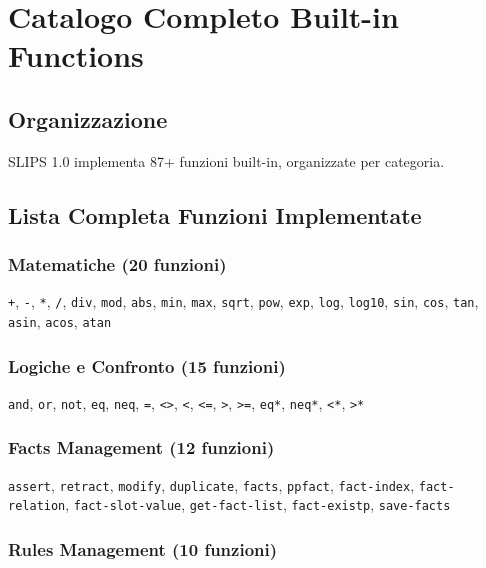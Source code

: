 
\chapter{Catalogo Completo Built-in Functions}
\label{app:builtin}

\section{Organizzazione}

SLIPS 1.0 implementa 87+ funzioni built-in, organizzate per categoria.

\section{Lista Completa Funzioni Implementate}

\subsection{Matematiche (20 funzioni)}

\texttt{+}, \texttt{-}, \texttt{*}, \texttt{/}, \texttt{div}, \texttt{mod}, \texttt{abs}, \texttt{min}, \texttt{max}, \texttt{sqrt}, \texttt{pow}, \texttt{exp}, \texttt{log}, \texttt{log10}, \texttt{sin}, \texttt{cos}, \texttt{tan}, \texttt{asin}, \texttt{acos}, \texttt{atan}

\subsection{Logiche e Confronto (15 funzioni)}

\texttt{and}, \texttt{or}, \texttt{not}, \texttt{eq}, \texttt{neq}, \texttt{=}, \texttt{<>}, \texttt{<}, \texttt{<=}, \texttt{>}, \texttt{>=}, \texttt{eq*}, \texttt{neq*}, \texttt{<*}, \texttt{>*}

\subsection{Facts Management (12 funzioni)}

\texttt{assert}, \texttt{retract}, \texttt{modify}, \texttt{duplicate}, \texttt{facts}, \texttt{ppfact}, \texttt{fact-index}, \texttt{fact-relation}, \texttt{fact-slot-value}, \texttt{get-fact-list}, \texttt{fact-existp}, \texttt{save-facts}

\subsection{Rules Management (10 funzioni)}

